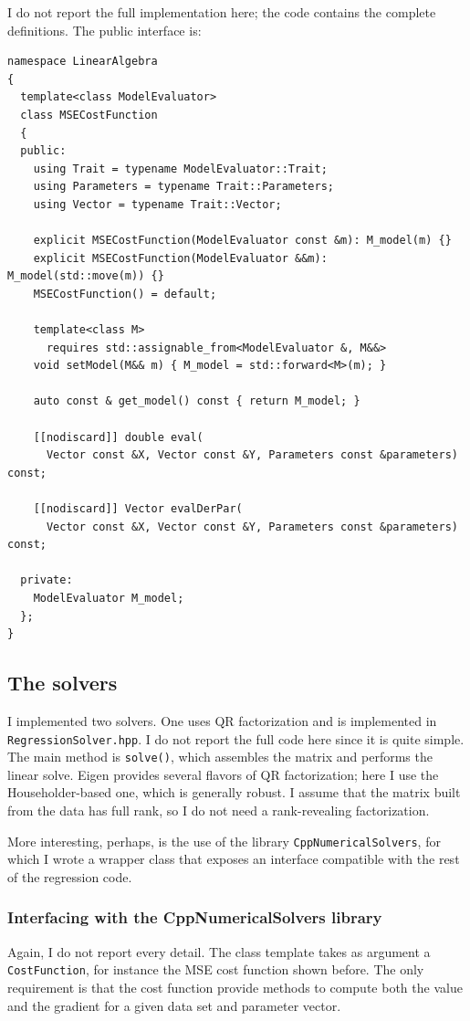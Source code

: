 \documentclass{article}
\newcommand{\li}{\lstinline}
\begin{document}
I do not report the full implementation here; the code contains the complete definitions. The public interface is:
\begin{lstlisting}[title={MSECostFunction.hpp}]
namespace LinearAlgebra
{
  template<class ModelEvaluator>
  class MSECostFunction
  {
  public:
    using Trait = typename ModelEvaluator::Trait;
    using Parameters = typename Trait::Parameters;
    using Vector = typename Trait::Vector;

    explicit MSECostFunction(ModelEvaluator const &m): M_model(m) {}
    explicit MSECostFunction(ModelEvaluator &&m): M_model(std::move(m)) {}
    MSECostFunction() = default;

    template<class M>
      requires std::assignable_from<ModelEvaluator &, M&&>
    void setModel(M&& m) { M_model = std::forward<M>(m); }

    auto const & get_model() const { return M_model; }

    [[nodiscard]] double eval(
      Vector const &X, Vector const &Y, Parameters const &parameters) const;

    [[nodiscard]] Vector evalDerPar(
      Vector const &X, Vector const &Y, Parameters const &parameters) const;

  private:
    ModelEvaluator M_model;
  };
}
\end{lstlisting}

\subsection{The solvers}
I implemented two solvers. One uses QR factorization and is implemented in \texttt{RegressionSolver.hpp}. I do not report the full code here since it is quite simple. The main method is \li!solve()!, which assembles the matrix and performs the linear solve. Eigen provides several flavors of QR factorization; here I use the Householder-based one, which is generally robust. I assume that the matrix built from the data has full rank, so I do not need a rank-revealing factorization.

More interesting, perhaps, is the use of the library \texttt{CppNumericalSolvers}, for which I wrote a wrapper class that exposes an interface compatible with the rest of the regression code.

\subsubsection{Interfacing with the CppNumericalSolvers library}
Again, I do not report every detail. The class template takes as argument a \li!CostFunction!, for instance the MSE cost function shown before. The only requirement is that the cost function provide methods to compute both the value and the gradient for a given data set and parameter vector.
\end{document}
